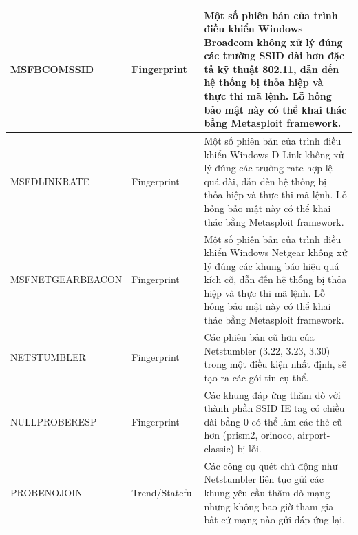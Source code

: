 \begin{table}[!htbp]
\begin{tabular}{|p{4.4cm}|p{2.3cm}|p{7.3cm}|}
MSFBCOMSSID                                                                   & Fingerprint    & Một số phiên bản của trình điều khiển Windows Broadcom không xử lý đúng các trường SSID dài hơn đặc tả kỹ thuật 802.11, dẫn đến hệ thống bị thỏa hiệp và thực thi mã lệnh. Lỗ hỏng bảo mật này có thể khai thác bằng Metasploit framework.                                                                              \\ \hline
MSFDLINKRATE                                                                  & Fingerprint    & Một số phiên bản của trình điều khiển Windows D-Link không xử lý đúng các trường rate hợp lệ quá dài, dẫn đến hệ thống bị thỏa hiệp và thực thi mã lệnh. Lỗ hỏng bảo mật này có thể khai thác bằng Metasploit framework.                                                                                               \\ \hline
MSFNETGEARBEACON                                                              & Fingerprint    & Một số phiên bản của trình điều khiển Windows Netgear không xử lý đúng các khung báo hiệu quá kích cỡ, dẫn đến hệ thống bị thỏa hiệp và thực thi mã lệnh. Lỗ hỏng bảo mật này có thể khai thác bằng Metasploit framework.                                                                                                \\ \hline
NETSTUMBLER                                                                   & Fingerprint    & Các phiên bản cũ hơn của Netstumbler (3.22, 3.23, 3.30) trong một điều kiện nhất định, sẽ tạo ra các gói tin cụ thể.                                                                                                                                                                                                 \\ \hline
NULLPROBERESP                                                                 & Fingerprint    & Các khung đáp ứng thăm dò với thành phần SSID IE tag có chiều dài bằng 0 có thể làm các thẻ cũ hơn (prism2, orinoco, airport-classic) bị lỗi.                                                                                                                                                                       \\ \hline
PROBENOJOIN                                                                   & Trend/Stateful & Các công cụ quét chủ động như Netstumbler liên tục gửi các khung yêu cầu thăm dò mạng nhưng không bao giờ tham gia bất cứ mạng nào gửi đáp ứng lại.                                                                                                                                                                         \\ \hline
\end{tabular}
\end{table}

